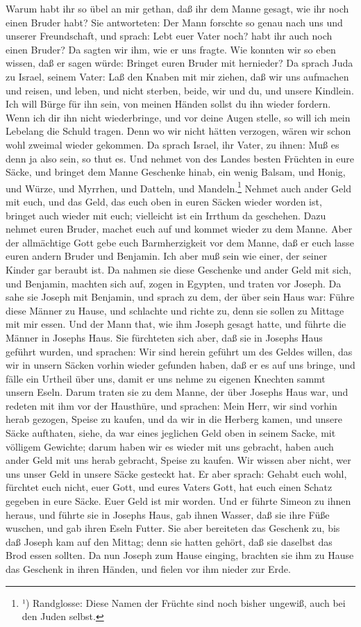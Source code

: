Warum habt ihr so übel an mir gethan, daß ihr dem Manne gesagt, wie ihr noch einen Bruder habt? Sie antworteten: Der Mann forschte so genau nach uns und unserer Freundschaft, und sprach: Lebt euer Vater noch? habt ihr auch noch einen Bruder? Da sagten wir ihm, wie er uns fragte. Wie konnten wir so eben wissen, daß er sagen würde: Bringet euren Bruder mit hernieder? Da sprach Juda zu Israel, seinem Vater: Laß den Knaben mit mir ziehen, daß wir uns aufmachen und reisen, und leben, und nicht sterben, beide, wir und du, und unsere Kindlein. Ich will Bürge für ihn sein, von meinen Händen sollst du ihn wieder fordern. Wenn ich dir ihn nicht wiederbringe, und vor deine Augen stelle, so will ich mein Lebelang die Schuld tragen. Denn wo wir nicht hätten verzogen, wären wir schon wohl zweimal wieder gekommen. Da sprach Israel, ihr Vater, zu ihnen: Muß es denn ja also sein, so thut es. Und nehmet von des Landes besten Früchten in eure Säcke, und bringet dem Manne Geschenke hinab, ein wenig Balsam, und Honig, und Würze, und Myrrhen, und Datteln, und Mandeln.\footnote{¹) Randglosse: Diese Namen der Früchte sind noch bisher ungewiß, auch bei den Juden selbst.} Nehmet auch ander Geld mit euch, und das Geld, das euch oben in euren Säcken wieder worden ist, bringet auch wieder mit euch; vielleicht ist ein Irrthum da geschehen. Dazu nehmet euren Bruder, machet euch auf und kommet wieder zu dem Manne. Aber der allmächtige Gott gebe euch Barmherzigkeit vor dem Manne, daß er euch lasse euren andern Bruder und Benjamin. Ich aber muß sein wie einer, der seiner Kinder gar beraubt ist. Da nahmen sie diese Geschenke und ander Geld mit sich, und Benjamin, machten sich auf, zogen in Egypten, und traten vor Joseph. Da sahe sie Joseph mit Benjamin, und sprach zu dem, der über sein Haus war: Führe diese Männer zu Hause, und schlachte und richte zu, denn sie sollen zu Mittage mit mir essen. Und der Mann that, wie ihm Joseph gesagt hatte, und führte die Männer in Josephs Haus. Sie fürchteten sich aber, daß sie in Josephs Haus geführt wurden, und sprachen: Wir sind herein geführt um des Geldes willen, das wir in unsern Säcken vorhin wieder gefunden haben, daß er es auf uns bringe, und fälle ein Urtheil über uns, damit er uns nehme zu eigenen Knechten sammt unsern Eseln. Darum traten sie zu dem Manne, der über Josephs Haus war, und redeten mit ihm vor der Hausthüre, und sprachen: Mein Herr, wir sind vorhin herab gezogen, Speise zu kaufen, und da wir in die Herberg kamen, und unsere Säcke aufthaten, siehe, da war eines jeglichen Geld oben in seinem Sacke, mit völligem Gewichte; darum haben wir es wieder mit uns gebracht, haben auch ander Geld mit uns herab gebracht, Speise zu kaufen. Wir wissen aber nicht, wer uns unser Geld in unsere Säcke gesteckt hat. Er aber sprach: Gehabt euch wohl, fürchtet euch nicht, euer Gott, und eures Vaters Gott, hat euch einen Schatz gegeben in eure Säcke. Euer Geld ist mir worden. Und er führte Simeon zu ihnen heraus, und führte sie in Josephs Haus, gab ihnen Wasser, daß sie ihre Füße wuschen, und gab ihren Eseln Futter. Sie aber bereiteten das Geschenk zu, bis daß Joseph kam auf den Mittag; denn sie hatten gehört, daß sie daselbst das Brod essen sollten. Da nun Joseph zum Hause einging, brachten sie ihm zu Hause das Geschenk in ihren Händen, und fielen vor ihm nieder zur Erde. 